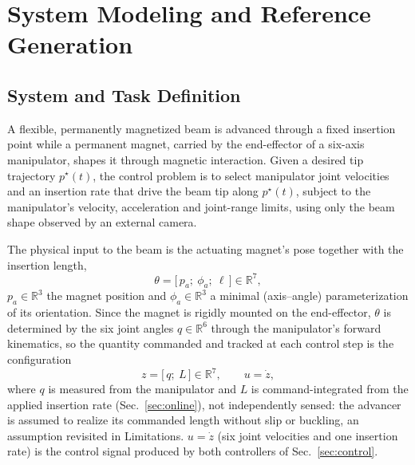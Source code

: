 \documentclass[journal]{IEEEtran}
\begin{document}

\section{System Modeling and Reference Generation}
\label{sec:system}

\subsection{System and Task Definition}
\label{sec:problem}

A flexible, permanently magnetized beam is advanced through a fixed
insertion point while a permanent magnet, carried by the end-effector of a
six-axis manipulator, shapes it through magnetic interaction. Given a
desired tip trajectory $p^\star(t)$, the control problem is to select
manipulator joint velocities and an insertion rate that drive the beam tip
along $p^\star(t)$, subject to the manipulator's velocity, acceleration
and joint-range limits, using only the beam shape observed by an external
camera.

The physical input to the beam is the actuating magnet's pose together
with the insertion length,
\begin{equation}
\theta = \big[\,p_a;\ \phi_a;\ \ell\,\big]\in\mathbb{R}^{7},
\label{eq:theta}
\end{equation}
$p_a\in\mathbb{R}^3$ the magnet position and $\phi_a\in\mathbb{R}^3$ a
minimal (axis--angle) parameterization of its orientation. Since the
magnet is rigidly mounted on the end-effector, $\theta$ is determined by
the six joint angles $q\in\mathbb{R}^6$ through the manipulator's forward
kinematics, so the quantity commanded and tracked at each control step is
the configuration
\begin{equation}
z = \big[\,q;\ L\,\big]\in\mathbb{R}^{7}, \qquad u=\dot z,
\label{eq:config}
\end{equation}
where $q$ is measured from the manipulator and $L$ is command-integrated
from the applied insertion rate (Sec.~\ref{sec:online}), not
independently sensed: the advancer is assumed to realize its commanded
length without slip or buckling, an assumption revisited in Limitations.
$u=\dot z$ (six joint velocities and one insertion rate) is the control
signal produced by both controllers of Sec.~\ref{sec:control}.
\end{document}
